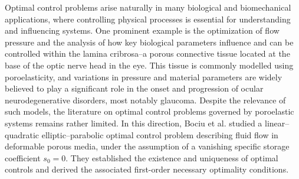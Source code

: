 \documentclass{amsart}
\begin{document}
Optimal control problems arise naturally in many biological and biomechanical applications, where controlling physical processes is essential for understanding and influencing systems. One prominent example is the optimization of flow pressure and the analysis of how key biological parameters influence and can be controlled within the lamina cribrosa--a porous connective tissue located at the base of the optic nerve head in the eye. This tissue is commonly modelled using poroelasticity, and variations in pressure and material parameters are widely believed to play a significant role in the onset and progression of ocular neurodegenerative disorders, most notably glaucoma. Despite the relevance of such models, the literature on optimal control problems governed by poroelastic systems remains rather limited. In this direction, Bociu et al. \cite{MR4410836} studied a linear–quadratic elliptic–parabolic optimal control problem describing fluid flow in deformable porous media, under the assumption of a vanishing specific storage coefficient $s_{0} = 0$. They established the existence and uniqueness of optimal controls and derived the associated first-order necessary optimality conditions.


\end{document}
